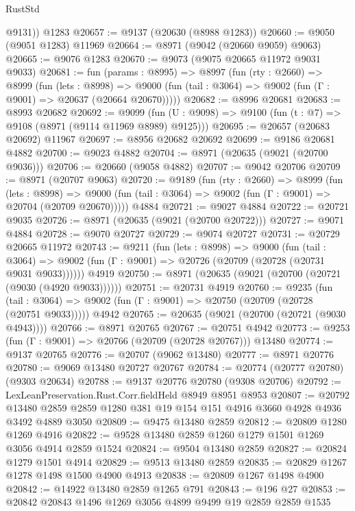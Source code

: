 \begin{lexlean}{RustStd}
\begin{coremodule}
        @9131))
    @1283
@20657 := @9137 (@20630 (@8988 @1283))
@20660 := @9050 (@9051 @1283) @11969
@20664 := @8971 (@9042 (@20660 @9059) @9063)
@20665 := @9076 @1283
@20670 := @9073 (@9075 @20665 @11972 @9031 @9033)
@20681 := fun (params : @8995) =>
  @8997
    (fun (rty : @2660) =>
    @8999
      (fun (lets : @8998) =>
      @9000 (fun (tail : @3064) => @9002 (fun (Γ : @9001) => @20637 (@20664 @20670)))))
@20682 := @8996 @20681
@20683 := @8993 @20682
@20692 := @9099
    (fun (U : @9098) => @9100 (fun (t : @7) => @9108 (@8971 (@9114 @11969 @8989) @9125)))
@20695 := @20657 (@20683 @20692) @11967
@20697 := @8956 @20682 @20692
@20699 := @9186 @20681 @4882
@20700 := @9023 @4882
@20704 := @8971 (@20635 (@9021 (@20700 @9036)))
@20706 := @20660 (@9058 @4882)
@20707 := @9042 @20706
@20709 := @8971 (@20707 @9063)
@20720 := @9189
    (fun (rty : @2660) =>
    @8999
      (fun (lets : @8998) =>
      @9000 (fun (tail : @3064) => @9002 (fun (Γ : @9001) => @20704 (@20709 @20670)))))
    @4884
@20721 := @9027 @4884
@20722 := @20721 @9035
@20726 := @8971 (@20635 (@9021 (@20700 @20722)))
@20727 := @9071 @4884
@20728 := @9070 @20727
@20729 := @9074 @20727
@20731 := @20729 @20665 @11972
@20743 := @9211
    (fun (lets : @8998) =>
    @9000
      (fun (tail : @3064) =>
      @9002 (fun (Γ : @9001) => @20726 (@20709 (@20728 (@20731 @9031 @9033))))))
    @4919
@20750 := @8971 (@20635 (@9021 (@20700 (@20721 (@9030 (@4920 @9033))))))
@20751 := @20731 @4919
@20760 := @9235
    (fun (tail : @3064) => @9002 (fun (Γ : @9001) => @20750 (@20709 (@20728 (@20751 @9033)))))
    @4942
@20765 := @20635 (@9021 (@20700 (@20721 (@9030 @4943))))
@20766 := @8971 @20765
@20767 := @20751 @4942
@20773 := @9253 (fun (Γ : @9001) => @20766 (@20709 (@20728 @20767))) @13480
@20774 := @9137 @20765
@20776 := @20707 (@9062 @13480)
@20777 := @8971 @20776
@20780 := @9069 @13480 @20727 @20767
@20784 := @20774 (@20777 @20780) (@9303 @20634)
@20788 := @9137 @20776 @20780 (@9308 @20706)
@20792 := LexLeanPreservation.Rust.Corr.fieldHeld @8949 @8951 @8953
@20807 := @20792
    @13480
    @2859
    @2859
    @1280
    @381
    @19
    @154
    @151
    @4916
    @3660
    @4928
    @4936
    @3492
    @4889
    @3050
@20809 := @9475 @13480 @2859
@20812 := @20809 @1280 @1269 @4916
@20822 := @9528 @13480 @2859 @1260 @1279 @1501 @1269 @3056 @4914 @2859 @1524
@20824 := @9504 @13480 @2859
@20827 := @20824 @1279 @1501 @4914
@20829 := @9513 @13480 @2859
@20835 := @20829 @1267 @1278 @1498 @1500 @4900 @4913
@20838 := @20809 @1267 @1498 @4900
@20842 := @14922 @13480 @2859 @1265 @791
@20843 := @196 @27
@20853 := @20842 @20843 @1496 @1269 @3056 @4899 @9499 @19 @2859 @2859 @1535

\end{coremodule}
\end{lexlean}
